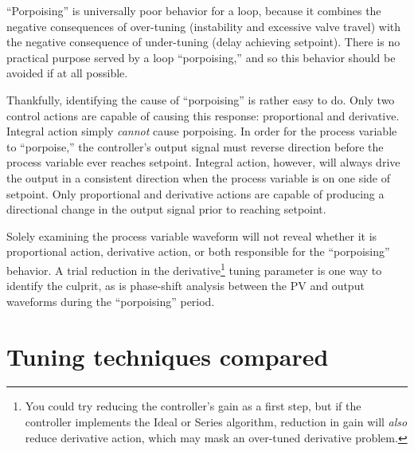 ``Porpoising'' is universally poor behavior for a loop, because it combines the negative consequences of over-tuning (instability and excessive valve travel) with the negative consequence of under-tuning (delay achieving setpoint).  There is no practical purpose served by a loop ``porpoising,'' and so this behavior should be avoided if at all possible.

\vskip 10pt

Thankfully, identifying the cause of ``porpoising'' is rather easy to do.  Only two control actions are capable of causing this response: proportional and derivative.  Integral action simply \textit{cannot} cause porpoising.  In order for the process variable to ``porpoise,'' the controller's output signal must reverse direction before the process variable ever reaches setpoint.  Integral action, however, will always drive the output in a consistent direction when the process variable is on one side of setpoint.  Only proportional and derivative actions are capable of producing a directional change in the output signal prior to reaching setpoint.  

Solely examining the process variable waveform will not reveal whether it is proportional action, derivative action, or both responsible for the ``porpoising'' behavior.  A trial reduction in the derivative\footnote{You could try reducing the controller's gain as a first step, but if the controller implements the Ideal or Series algorithm, reduction in gain will \textit{also} reduce derivative action, which may mask an over-tuned derivative problem.} tuning parameter is one way to identify the culprit, as is phase-shift analysis between the PV and output waveforms during the ``porpoising'' period.  










\filbreak
\section{Tuning techniques compared}

